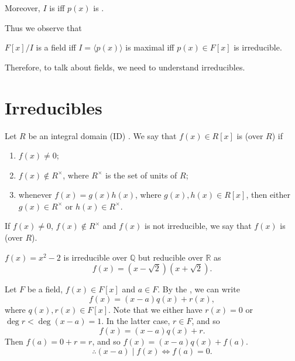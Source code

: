 \documentclass[notoc,notitlepage]{tufte-book}
\begin{document}
Moreover, $I$ is  iff $p(x)$ is .

Thus we observe that
\begin{center}
  $F[x]/I$ is a field iff $I = \langle p(x) \rangle$ is maximal iff $p(x) \in F[x]$ is irreducible.
\end{center}

Therefore, to talk about fields, we need to understand irreducibles.


\section{Irreducibles}%
\label{sec:irreducibles}

\begin{defn}[Irreducible]\label{defn:irreducible}
  Let $R$ be an integral domain (ID) . We say that $f(x) \in R[x]$ is 
  (over $R$) if
  \begin{enumerate}
    \item $f(x) \neq 0$;
    \item $f(x) \notin R^\times$, where $R^\times$ is the set of units of $R$;
    \item whenever $f(x) = g(x) h(x)$, where $g(x), h(x) \in R[x]$, then either 
      $g(x) \in R^\times$ or $h(x) \in R^\times$.
  \end{enumerate}
  If $f(x) \neq 0$, $f(x) \notin R^\times$ and $f(x)$ is not irreducible, we say that
  $f(x)$ is  (over $R$).
\end{defn}

\begin{eg}
  $f(x) = x^2 - 2$ is irreducible over $\mathbb{Q}$ but reducible over $\mathbb{R}$ as
  \begin{equation*}
    f(x) = \left(x - \sqrt{2}\right)\left(x + \sqrt{2}\right).
  \end{equation*}
\end{eg}

Let $F$ be a field, $f(x) \in F[x]$ and $a \in F$. By the ,
we can write
\begin{equation*}
  f(x) = (x - a) q(x) + r(x),
\end{equation*}
where $q(x), r(x) \in F[x]$. Note that we either have $r(x) = 0$ or 
$\deg r < \deg (x - a) = 1$. In the latter case, $r \in F$, and so
\begin{equation*}
  f(x) = (x - a) q(x) + r.
\end{equation*}
Then $f(a) = 0 + r = r$, and so $f(x) = (x - a) q(x) + f(a)$.
\begin{equation*}
  \therefore (x - a) \mid f(x) \iff f(a) = 0.
\end{equation*}
\end{document}
